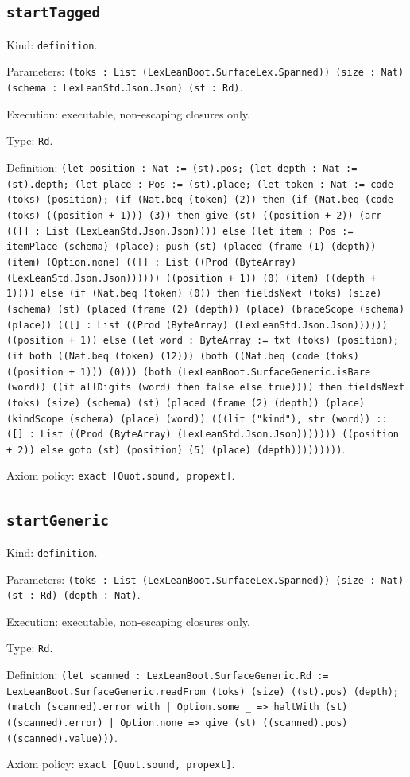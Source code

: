 \documentclass[11pt]{article}
\begin{document}
\subsection*{\texttt{startTagged}}
\noindent Kind: \texttt{definition}.\par
\noindent Parameters: \texttt{(toks : List (LexLeanBoot.SurfaceLex.Spanned)) (size : Nat) (schema : LexLeanStd.Json.Json) (st : Rd)}.\par
\noindent Execution: executable, non-escaping closures only.\par
\noindent Type: \texttt{Rd}.\par
\noindent Definition: \texttt{(let position : Nat := (st).pos; (let depth : Nat := (st).depth; (let place : Pos := (st).place; (let token : Nat := code (toks) (position); (if (Nat.beq (token) (2)) then (if (Nat.beq (code (toks) ((position + 1))) (3)) then give (st) ((position + 2)) (arr (([] : List (LexLeanStd.Json.Json)))) else (let item : Pos := itemPlace (schema) (place); push (st) (placed (frame (1) (depth)) (item) (Option.none) (([] : List ((Prod (ByteArray) (LexLeanStd.Json.Json)))))) ((position + 1)) (0) (item) ((depth + 1)))) else (if (Nat.beq (token) (0)) then fieldsNext (toks) (size) (schema) (st) (placed (frame (2) (depth)) (place) (braceScope (schema) (place)) (([] : List ((Prod (ByteArray) (LexLeanStd.Json.Json)))))) ((position + 1)) else (let word : ByteArray := txt (toks) (position); (if both ((Nat.beq (token) (12))) (both ((Nat.beq (code (toks) ((position + 1))) (0))) (both (LexLeanBoot.SurfaceGeneric.isBare (word)) ((if allDigits (word) then false else true)))) then fieldsNext (toks) (size) (schema) (st) (placed (frame (2) (depth)) (place) (kindScope (schema) (place) (word)) (((lit ("kind"), str (word)) :: ([] : List ((Prod (ByteArray) (LexLeanStd.Json.Json))))))) ((position + 2)) else goto (st) (position) (5) (place) (depth)))))))))}.\par
\noindent Axiom policy: \texttt{exact [Quot.sound, propext]}.\par
\subsection*{\texttt{startGeneric}}
\noindent Kind: \texttt{definition}.\par
\noindent Parameters: \texttt{(toks : List (LexLeanBoot.SurfaceLex.Spanned)) (size : Nat) (st : Rd) (depth : Nat)}.\par
\noindent Execution: executable, non-escaping closures only.\par
\noindent Type: \texttt{Rd}.\par
\noindent Definition: \texttt{(let scanned : LexLeanBoot.SurfaceGeneric.Rd := LexLeanBoot.SurfaceGeneric.readFrom (toks) (size) ((st).pos) (depth); (match (scanned).error with | Option.some \_ => haltWith (st) ((scanned).error) | Option.none => give (st) ((scanned).pos) ((scanned).value)))}.\par
\noindent Axiom policy: \texttt{exact [Quot.sound, propext]}.\par
\end{document}
